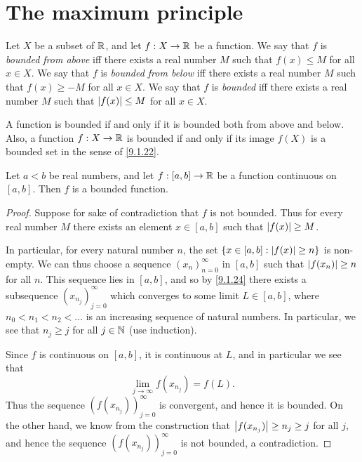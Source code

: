 \section{The maximum principle}\label{sec:9.6}

\begin{defn}\label{9.6.1}
  Let \(X\) be a subset of \(\mathbb{R}\), and let \(f : X \to \mathbb{R}\) be a function.
  We say that \(f\) is \emph{bounded from above} iff there exists a real number \(M\) such that \(f(x) \leq M\) for all \(x \in X\).
  We say that \(f\) is \emph{bounded from below} iff there exists a real number \(M\) such that \(f(x) \geq -M\) for all \(x \in X\).
  We say that \(f\) is \emph{bounded} iff there exists a real number \(M\) such that \(\left\lvert f(x)\right\rvert \leq M\) for all \(x \in X\).
\end{defn}

\begin{rmk}\label{9.6.2}
  A function is bounded if and only if it is bounded both from above and below.
  Also, a function \(f : X \to \mathbb{R}\) is bounded if and only if its image \(f(X)\) is a bounded set in the sense of \cref{9.1.22}.
\end{rmk}

\begin{lem}\label{9.6.3}
  Let \(a < b\) be real numbers, and let \(f : [a, b] \to \mathbb{R}\) be a function continuous on \([a, b]\).
  Then \(f\) is a bounded function.
\end{lem}

\begin{proof}
  Suppose for sake of contradiction that \(f\) is not bounded.
  Thus for every real number \(M\) there exists an element \(x \in [a, b]\) such that \(\left\lvert f(x)\right\rvert \geq M\).

  In particular, for every natural number \(n\), the set \(\{x \in [a, b] : \left\lvert f(x)\right\rvert \geq n\}\) is non-empty.
  We can thus choose a sequence \((x_n)_{n = 0}^\infty\) in \([a, b]\) such that \(\left\lvert f(x_n)\right\rvert \geq n\) for all \(n\).
  This sequence lies in \([a, b]\), and so by \cref{9.1.24} there exists a subsequence \((x_{n_j})_{j = 0}^\infty\) which converges to some limit \(L \in [a, b]\), where \(n_0 < n_1 < n_2 < \dots\) is an increasing sequence of natural numbers.
  In particular, we see that \(n_j \geq j\) for all \(j \in \mathbb{N}\) (use induction).

  Since \(f\) is continuous on \([a, b]\), it is continuous at \(L\), and in particular we see that
  \[
    \lim_{j \to \infty} f(x_{n_j}) = f(L).
  \]
  Thus the sequence \((f(x_{n_j}))_{j = 0}^\infty\) is convergent, and hence it is bounded.
  On the other hand, we know from the construction that \(\left\lvert f(x_{n_j})\right\rvert \geq n_j \geq j\) for all \(j\), and hence the sequence \((f(x_{n_j}))_{j = 0}^\infty\) is not bounded, a contradiction.
\end{proof}


